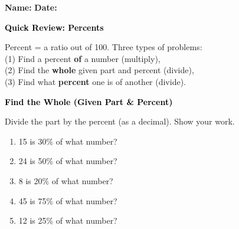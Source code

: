 \documentclass[12pt, letterpaper, fleqn]{article}
\begin{document}
\textbf{Name:} \underline{\hspace{5cm}}
\hfill
\textbf{Date:} \underline{\hspace{3cm}}\\

\begin{tcolorbox}[colback=customteal!20]
    \large\textcolor{black}{\textbf{Quick Review: Percents}}
\end{tcolorbox}

\vspace{3mm}

\noindent
Percent = a ratio out of 100. Three types of problems: \\
(1) Find a percent \textbf{of} a number (multiply), \\
(2) Find the \textbf{whole} given part and percent (divide), \\
(3) Find what \textbf{percent} one is of another (divide).

\vspace{4mm}

\begin{tcolorbox}[colback=customteal!20]
\large\textcolor{black}{\textbf{Find the Whole (Given Part \& Percent)}}
\end{tcolorbox}

\noindent
Divide the part by the percent (as a decimal). Show your work.

\vspace{3mm}

\begin{enumerate}[itemsep=0.8cm, leftmargin=0.6cm]

\item 15 is 30\% of what number?

\vspace{1.3cm}

\item 24 is 50\% of what number?

\vspace{1.3cm}

\item 8 is 20\% of what number?

\vspace{1.3cm}

\item 45 is 75\% of what number?

\vspace{1.3cm}

\item 12 is 25\% of what number?

\vspace{1.3cm}


\end{enumerate}
\end{document}
